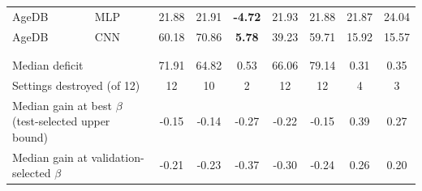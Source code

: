 \begin{table}[t]
\begin{center}
\begin{tabular}{llccccc|cc}
AgeDB & MLP & 21.88 & 21.91 & \textbf{-4.72} & 21.93 & 21.88 & 21.87 & 24.04 \\
AgeDB & CNN & 60.18 & 70.86 & \textbf{5.78} & 39.23 & 59.71 & 15.92 & 15.57 \\
\\[-1.5ex]
\hline \\[-1.8ex]
\multicolumn{2}{l}{Median deficit} & 71.91 & 64.82 & 0.53 & 66.06 & 79.14 & 0.31 & 0.35 \\
\multicolumn{2}{l}{Settings destroyed (of 12)} & 12 & 10 & 2 & 12 & 12 & 4 & 3 \\
\multicolumn{2}{l}{Median gain at best $\beta$ (test-selected upper bound)} & -0.15 & -0.14 & -0.27 & -0.22 & -0.15 & 0.39 & 0.27 \\
\multicolumn{2}{l}{Median gain at validation-selected $\beta$} & -0.21 & -0.23 & -0.37 & -0.30 & -0.24 & 0.26 & 0.20 \\
\end{tabular}\end{center}\end{table}
